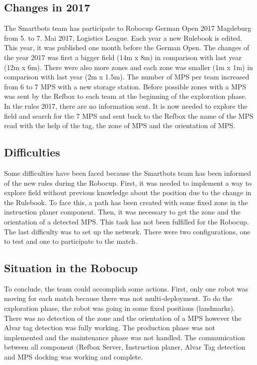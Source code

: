 \subsection{Changes in 2017}

The Smartbots team has participate to Robocup German Open 2017 Magdeburg from 5. to 7. Mai 2017, Logistics League. Each year a new Rulebook is edited. This year, it was published one month before the German Open. The changes of the year 2017 was first a bigger field (14m x 8m) in comparison with last year (12m x 6m). There were also more zones and each zone was smaller (1m x 1m) in comparison with last year (2m x 1.5m). The number of MPS per team increased from 6 to 7 MPS with a new storage station. Before possible zones with a MPS was sent by the Refbox to each team at the beginning of the exploration phase. In the rules 2017, there are no information sent. It is now needed to explore the field and search for the 7 MPS and sent back to the Refbox the name of the MPS read with the help of the tag, the zone of MPS and the orientation of MPS. 


\subsection{Difficulties}

Some difficulties have been faced because the Smartbots team has been informed of the new rules during the Robocup. First, it was needed to implement a way to explore field without previous knowledge about the position due to the change in the Rulebook. To face this, a path has been created with some fixed zone in the instruction planer component.  Then, it was necessary to get the zone and the orientation of a detected MPS. This task has not been fulfilled for the Robocup. The last difficulty was to set up the network. There were two configurations, one to test and one to participate to the match.
 

\subsection{Situation in the Robocup}

To conclude, the team could accomplish some actions. First, only one robot was moving for each match because there was not multi-deployment. To do the exploration phase, the robot was going in some fixed positions (landmarks). There was no detection of the zone and the orientation of a MPS however the Alvar tag detection was fully working. The production phase was not implemented and the maintenance phase was not handled. The communication between all component (Refbox Server, Instruction planer, Alvar Tag detection and MPS docking was working and complete. 